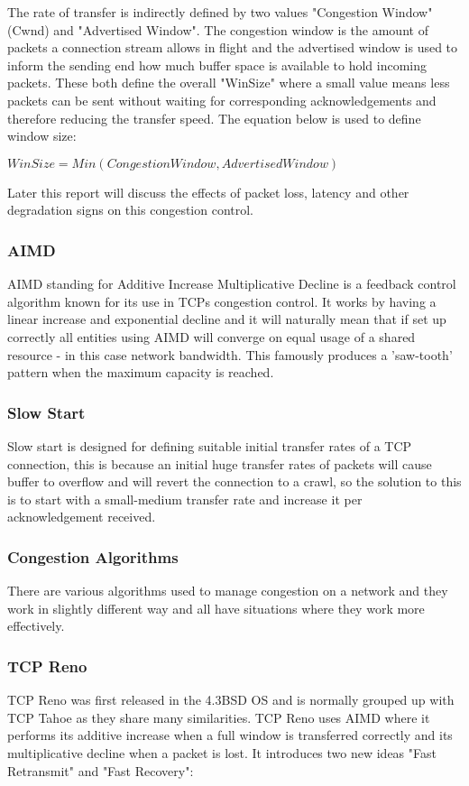 The rate of transfer is indirectly defined by two values "Congestion Window" (Cwnd) and "Advertised Window". The congestion window is the amount of packets a connection stream allows in flight and the advertised window is used to inform the sending end how much buffer space is available to hold incoming packets. These both define the overall "WinSize" where a small value means less packets can be sent without waiting for corresponding acknowledgements and therefore reducing the transfer speed. The equation below is used to define window size: 

\begin{center}
	$WinSize = Min(CongestionWindow, AdvertisedWindow)$
\end{center}

Later this report will discuss the effects of packet loss, latency and other degradation signs on this congestion control.

 
\subsubsection*{AIMD}
AIMD standing for Additive Increase Multiplicative Decline is a feedback control algorithm known for its use in TCPs congestion control. It works by having a linear increase and exponential decline and it will naturally mean that if set up correctly all entities using AIMD will converge on equal usage of a shared resource - in this case network bandwidth. This famously produces a 'saw-tooth' pattern when the maximum capacity is reached.

\subsubsection*{Slow Start}
Slow start is designed for defining suitable initial transfer rates of a TCP connection, this is because an initial huge transfer rates of packets will cause buffer to overflow and will revert the connection to a crawl, so the solution to this is to start with a small-medium transfer rate and increase it per acknowledgement received.

\subsubsection*{Congestion Algorithms}
There are various algorithms used to manage congestion on a network and they work in slightly different way and all have situations where they work more effectively.


\subsubsection*{TCP Reno}
TCP Reno was first released in the 4.3BSD OS and is normally grouped up with TCP Tahoe as they share many similarities. TCP Reno uses AIMD  where it performs its additive increase when a full window is transferred correctly and its multiplicative decline when a packet is lost. It introduces two new ideas "Fast Retransmit" and "Fast Recovery":

